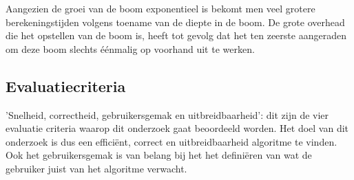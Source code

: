 \documentclass[Main.tex]{subfiles}
\begin{document}
Aangezien de groei van de boom exponentieel is bekomt men veel grotere berekeningstijden volgens toename van de diepte in de boom. De grote overhead die het opstellen van de boom is, heeft tot gevolg dat het ten zeerste aangeraden om deze boom slechts \'e\'enmalig op voorhand uit te werken.

\subsection{Evaluatiecriteria}

'Snelheid, correctheid, gebruikersgemak en uitbreidbaarheid': dit zijn de vier evaluatie criteria waarop dit onderzoek gaat beoordeeld worden. Het doel van dit onderzoek is dus een effici\"ent, correct en uitbreidbaarheid algoritme te vinden. Ook het gebruikersgemak is van belang bij het het defini\"eren van wat de gebruiker juist van het algoritme verwacht.
\end{document}
